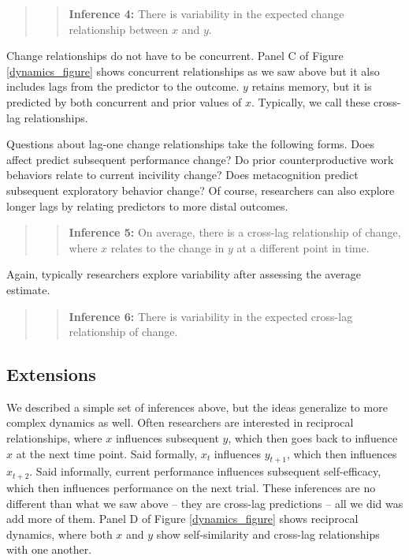 \documentclass[english,,man]{apa6}
\begin{document}
\begin{quote}
\begin{quote}
\textbf{Inference 4:} There is variability in the expected change relationship between \(x\) and \(y\).
\end{quote}
\end{quote}

Change relationships do not have to be concurrent. Panel C of Figure \ref{dynamics_figure} shows concurrent relationships as we saw above but it also includes lags from the predictor to the outcome. \(y\) retains memory, but it is predicted by both concurrent and prior values of \(x\). Typically, we call these cross-lag relationships.

Questions about lag-one change relationships take the following forms. Does affect predict subsequent performance change? Do prior counterproductive work behaviors relate to current incivility change? Does metacognition predict subsequent exploratory behavior change? Of course, researchers can also explore longer lags by relating predictors to more distal outcomes.

\begin{quote}
\begin{quote}
\textbf{Inference 5:} On average, there is a cross-lag relationship of change, where \(x\) relates to the change in \(y\) at a different point in time.
\end{quote}
\end{quote}

Again, typically researchers explore variability after assessing the average estimate.

\begin{quote}
\begin{quote}
\textbf{Inference 6:} There is variability in the expected cross-lag relationship of change.
\end{quote}
\end{quote}

\hypertarget{extensions}{%
\subsection{Extensions}\label{extensions}}

We described a simple set of inferences above, but the ideas generalize to more complex dynamics as well. Often researchers are interested in reciprocal relationships, where \(x\) influences subsequent \(y\), which then goes back to influence \(x\) at the next time point. Said formally, \(x_t\) influences \(y_{t+1}\), which then influences \(x_{t+2}\). Said informally, current performance influences subsequent self-efficacy, which then influences performance on the next trial. These inferences are no different than what we saw above -- they are cross-lag predictions -- all we did was add more of them. Panel D of Figure \ref{dynamics_figure} shows reciprocal dynamics, where both \(x\) and \(y\) show self-similarity and cross-lag relationships with one another.
\end{document}
